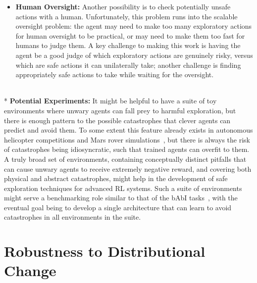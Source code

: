 \documentclass[a4paper,10pt]{article}
\begin{document}
\begin{itemize}
\item {\bf Human Oversight:}  Another possibility is to check potentially unsafe actions with a human. Unfortunately, this problem runs into the scalable oversight problem: the agent may need to make too many exploratory actions for human oversight to be practical, or may need to make them too fast for humans to judge them. A key challenge to making this work is having the agent be a good judge of which exploratory actions are genuinely risky, versus which are safe actions it can unilaterally take; another challenge is finding appropriately safe actions to take while waiting for the oversight.

\end{itemize}

$~$\\* {\bf Potential Experiments:}  It might be helpful to have a suite of toy environments where unwary agents can fall prey to harmful exploration, but there is enough pattern to the possible catastrophes that clever agents can predict and avoid them.  To some extent this feature already exists in autonomous helicopter competitions and Mars rover simulations~\cite{moldovan2012safe}, but there is always the risk of catastrophes being idiosyncratic, such that trained agents can overfit to them.  A truly broad set of environments, containing conceptually distinct pitfalls that can cause unwary agents to receive extremely negative reward, and covering both physical and abstract catastrophes, might help in the development of safe exploration techniques for advanced RL systems.  Such a suite of environments might serve a benchmarking role similar to that of the bAbI tasks~\cite{weston2015towards}, with the eventual goal being to develop a single architecture that can learn to avoid catastrophes in all environments in the suite.

\section{Robustness to Distributional Change} \label{problem:Robustness}
\end{document}
